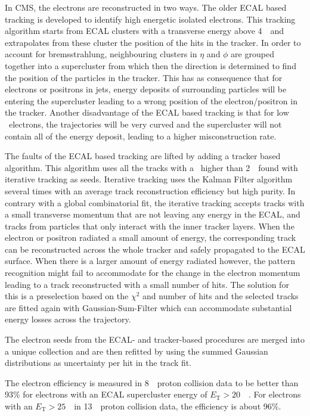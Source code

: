 In CMS, the electrons are reconstructed in two ways. The older ECAL based tracking is developed to identify high energetic isolated electrons. This tracking algorithm starts from ECAL clusters with a transverse energy above 4~\GeV\ and extrapolates from these cluster the position of the hits in the tracker. In order to account for bremsstrahlung, neighbouring clusters in $\eta$ and $\phi$
are grouped together into a supercluster from which then the direction is determined to find the position of the particles in the tracker. This has as consequence that for electrons or positrons in jets, energy deposits of surrounding particles will be entering the supercluster leading to a wrong position of the electron/positron in the tracker. Another disadvantage of the ECAL based tracking is that for low \pt\ electrons, the trajectories will be very curved and the supercluster will not contain all of the energy deposit, leading to a higher misconstruction rate. 

The faults of the ECAL based tracking are lifted by adding a tracker based algorithm. This algorithm uses all the tracks with a \pt\ higher than 2~\GeV\ found with iterative tracking as seeds. Iterative tracking uses the Kalman Filter algorithm several times with an average track reconstruction efficiency but high purity. In contrary with a global combinatorial fit, the iterative tracking accepts tracks with a small transverse momentum that are not leaving any energy in the ECAL, and tracks from particles that only interact with the inner tracker layers. When the electron or positron radiated a small amount of energy, the corresponding track can be reconstructed across the whole tracker and safely propagated to the ECAL surface. When there is a larger amount of energy radiated however, the pattern recognition might fail  to accommodate for the change in the electron momentum leading to a track reconstructed with a small number of hits. The solution for this is a preselection based on the $\chi^2$ and number of hits and the selected tracks are fitted again with Gaussian-Sum-Filter which can accommodate substantial energy losses across the trajectory. 

The electron seeds from the ECAL- and tracker-based procedures are merged into a unique collection and are then refitted  by using the summed Gaussian distributions as uncertainty per hit in the track fit. 

The electron efficiency is measured in 8~\TeV\ proton collision data to be better than 93\% for electrons with an ECAL supercluster energy of $E_{\mathrm{T}}>20$~\GeV~\cite{1748-0221-10-06-P06005}. For electrons with an  $E_{\mathrm{T}}>25$~\GeV\  in 13~\TeV\ proton collision data, the efficiency is about 96\%\cite{CMS-DP-2017-004}.

